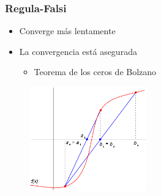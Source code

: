 \documentclass{beamer}
\begin{document}
	\begin{frame}
		\frametitle{Regula-Falsi}
		
		\begin{itemize}
			\item Converge más lentamente
			\item La convergencia está asegurada
			\begin{itemize}
				\item Teorema de los ceros de Bolzano
			\end{itemize}
		\end{itemize}
		
		\begin{figure}[h]
			\begin{center}
				\includegraphics[width=0.45\textwidth]{imagenes/regulaF.png}
			\end{center}
		\end{figure}
		
	\end{frame}
\end{document}
